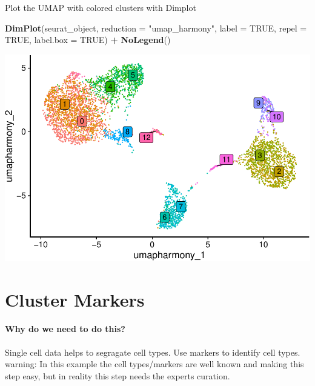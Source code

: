\documentclass[
]{book}
\newenvironment{Shaded}{\begin{snugshade}}{\end{snugshade}}
\newcommand{\AttributeTok}[1]{\textcolor[rgb]{0.13,0.29,0.53}{#1}}
\newcommand{\ConstantTok}[1]{\textcolor[rgb]{0.56,0.35,0.01}{#1}}
\newcommand{\FunctionTok}[1]{\textcolor[rgb]{0.13,0.29,0.53}{\textbf{#1}}}
\newcommand{\NormalTok}[1]{#1}
\newcommand{\SpecialCharTok}[1]{\textcolor[rgb]{0.81,0.36,0.00}{\textbf{#1}}}
\newcommand{\StringTok}[1]{\textcolor[rgb]{0.31,0.60,0.02}{#1}}
\begin{document}
Plot the UMAP with colored clusters with Dimplot

\begin{Shaded}
\begin{Highlighting}[]
\FunctionTok{DimPlot}\NormalTok{(seurat\_object, }\AttributeTok{reduction =} \StringTok{"umap\_harmony"}\NormalTok{, }\AttributeTok{label =} \ConstantTok{TRUE}\NormalTok{, }\AttributeTok{repel =} \ConstantTok{TRUE}\NormalTok{, }\AttributeTok{label.box =} \ConstantTok{TRUE}\NormalTok{) }\SpecialCharTok{+} \FunctionTok{NoLegend}\NormalTok{()}
\end{Highlighting}
\end{Shaded}

\includegraphics{scRNAseqInR_ABACBS_2024_Doco_files/figure-latex/unnamed-chunk-23-1.pdf}

\hypertarget{clustermarkers}{%
\chapter{Cluster Markers}\label{clustermarkers}}

\hypertarget{why-do-we-need-to-do-this-7}{%
\subsubsection*{Why do we need to do this?}\label{why-do-we-need-to-do-this-7}}

Single cell data helps to segragate cell types. Use markers to identify cell types. warning: In this example the cell types/markers are well known and making this step easy, but in reality this step needs the experts curation.
\end{document}
